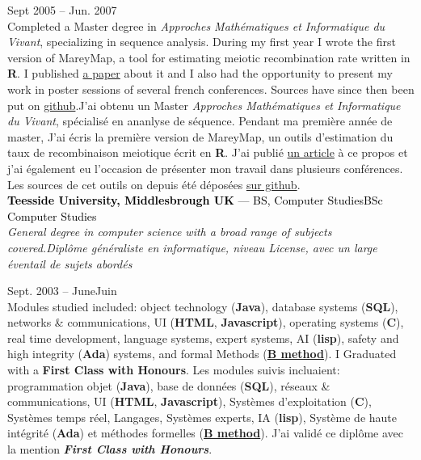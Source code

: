 \documentclass[a4paper]{article}
\newcommand\enfr[2]{\ifdefined\doen#1\else#2\fi\xspace}
\newcommand\js{\textbf{Javascript}\xspace}
\newcommand\sql{\textbf{SQL}\xspace}
\newcommand\clang{\textbf{C}\xspace}
\newcommand\rlang{\textbf{R}\xspace}
\newcommand\java{\textbf{Java}\xspace}
\newcommand\ada{\textbf{Ada}\xspace}
\newcommand\blang{\href{https://www.methode-b.com/en/b-method/}{\textbf{B method}}\xspace}
\newcommand\html{\textbf{HTML}\xspace}
\newcommand\lisp{\textbf{lisp}\xspace}
\newcommand\entry[2]{\large\textcolor{Black}{\textbf{#1} --- #2}\normalsize}
\newcommand\timespan[2]{\normalsize\textsf{#1 -- #2}}
\begin{document}
\begin{minipage}[t]{0.63\textwidth}
\vspace{0.5em}
\timespan{Sept 2005}{Jun. 2007}\\
\enfr{Completed a Master degree in \textit{Approches Mathématiques et Informatique du
  Vivant}, specializing in sequence analysis. During my first year I
wrote the first version of MareyMap, a tool for estimating meiotic
recombination rate written in \rlang. I published
\href{https://academic.oup.com/bioinformatics/article/23/16/2188/199692}{a
  paper} about it and I also had the opportunity to present my work in
poster sessions of several french conferences. Sources have since then
been put on \href{https://github.com/aursiber/MareyMap}{
  github}.}
{J'ai obtenu un Master \textit{Approches Mathématiques et Informatique du
    Vivant}, spécialisé en ananlyse de séquence. Pendant ma première
  année de master, J'ai écris la première version de MareyMap, un
  outils d'estimation du taux de recombinaison meiotique écrit en
  \rlang. J'ai publié \href{https://academic.oup.com/bioinformatics/article/23/16/2188/199692}{un
  article} à ce propos et j'ai également eu l'occasion de présenter
  mon travail dans plusieurs conférences. Les sources de cet outils on
  depuis été déposées
  \href{https://github.com/aursiber/MareyMap}{sur github}.}\\

\entry{Teesside University, Middlesbrough UK}{\enfr{BS, Computer Studies}{BSc Computer Studies}}\\
\textit{\enfr{General degree in computer science with a broad range of subjects covered.}
  {Diplôme généraliste en informatique, niveau License, avec un large éventail de sujets abordés}}

\vspace{0.5em}
\timespan{Sept. 2003}{\enfr{June}{Juin} 2005}\\
\enfr{
Modules studied included: object technology (\java), database systems (\sql), networks
\& communications, UI (\html, \js), operating systems (\clang), real time development,
language systems, expert systems, AI (\lisp), safety and high integrity (\ada)
systems, and formal Methods (\blang). I Graduated with a \textbf{First Class
  with Honours}.}{
 Les modules suivis incluaient: programmation objet (\java), base de
 données (\sql), réseaux \& communications, UI (\html, \js), Systèmes
 d'exploitation (\clang), Systèmes temps réel, Langages, Systèmes
 experts, IA (\lisp), Système de haute intégrité (\ada) et méthodes
 formelles (\blang). J'ai validé ce diplôme avec la mention
 \textit{\textbf{First Class with Honours}}.}\\



\end{minipage}
\end{document}
